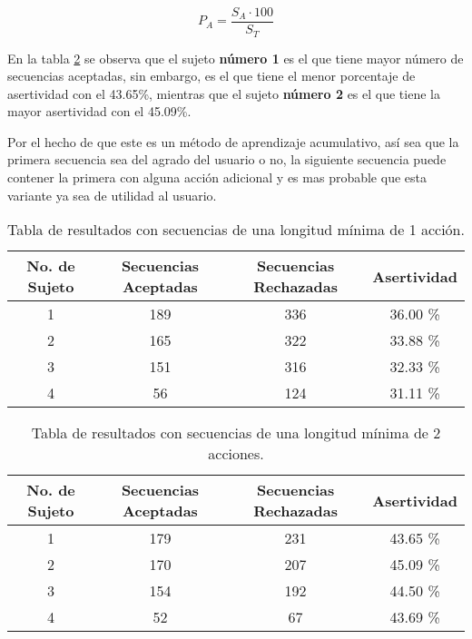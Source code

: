 \begin{equation}
P_A = \dfrac{ S_A \cdot 100}{S_T}
\label{eqAsertividad}
\end{equation}
 
 
En la tabla \ref{tableRes2} se observa que el sujeto \textbf{n\'umero 1} es 
 el que tiene mayor n\'umero de secuencias aceptadas, sin embargo, es el que 
 tiene el menor porcentaje de asertividad con el 43.65\%, mientras que el 
 sujeto \textbf{n\'umero 2} es el que tiene la mayor asertividad con el 
 45.09\%.


Por el hecho de que este es un m\'etodo de aprendizaje acumulativo, as\'i sea
 que la primera secuencia sea del agrado del usuario o no, la siguiente 
 secuencia puede contener la primera con alguna acci\'on adicional y es mas 
 probable que esta variante ya sea de utilidad al usuario. 


\begin{table}[]
\centering
\begin{tabular}{cccc}
\hline
No. de Sujeto	
&	Secuencias Aceptadas	
&   Secuencias Rechazadas	
&	Asertividad		\\ \hline

1				
&	189						
&	336						
&	36.00 \%		\\

2				
&	165						
&	322						
&	33.88 \%		\\

3
&	151
&	316
&	32.33 \%		\\

4
&	56
&	124
&	31.11 \%		\\
\hline
\end{tabular}
\caption{Tabla de resultados con secuencias de una longitud m\'inima de 
 1 acci\'on.}
\label{tableRes1}
\end{table}



\begin{table}[]
\centering
\begin{tabular}{cccc}
\hline
No. de Sujeto
&	Secuencias Aceptadas
&   Secuencias Rechazadas
&	Asertividad		\\ \hline

1
&	179
&	231
&	43.65 \%		\\
	
2
&	170
&	207
&	45.09 \%		\\

3
&	154
&	192
&	44.50 \%		\\

4
&	52
&	67
&	43.69 \%		\\
\hline
\end{tabular}
\caption{Tabla de resultados con secuencias de una longitud m\'inima de 
 2 acciones.}
\label{tableRes2}
\end{table}


